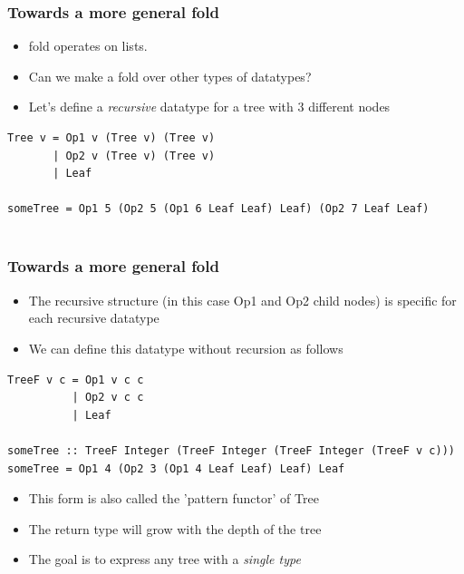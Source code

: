 \documentclass[10pt]{beamer}
\begin{document}
\begin{frame}[fragile]
\frametitle{Towards a more general fold}
\begin{itemize}
\item fold operates on lists.  
\item Can we make a fold over other types of datatypes?
\item Let's define a \textit{recursive} datatype for a tree with 3 different nodes
\end{itemize}

\begin{lstlisting}
Tree v = Op1 v (Tree v) (Tree v) 
       | Op2 v (Tree v) (Tree v) 
       | Leaf

someTree = Op1 5 (Op2 5 (Op1 6 Leaf Leaf) Leaf) (Op2 7 Leaf Leaf)
       
\end{lstlisting}

\end{frame}

\begin{frame}[fragile]
\frametitle{Towards a more general fold}
\begin{itemize}
\item The recursive structure (in this case Op1 and Op2 child nodes) is specific for each recursive datatype
\item We can define this datatype without recursion as follows
\end{itemize}

\begin{lstlisting}
TreeF v c = Op1 v c c
          | Op2 v c c 
          | Leaf 

someTree :: TreeF Integer (TreeF Integer (TreeF Integer (TreeF v c)))	  
someTree = Op1 4 (Op2 3 (Op1 4 Leaf Leaf) Leaf) Leaf	  
\end{lstlisting}


\begin{itemize}
\item This form is also called the 'pattern functor' of Tree		
\item The return type will grow with the depth of the tree 
\item The goal is to express any tree with a \textit{single type}	
\end{itemize}

\end{frame}
\end{document}

